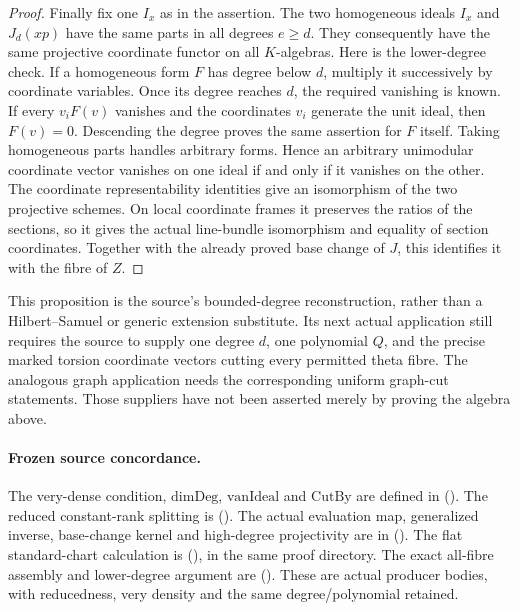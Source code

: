 \begin{proof}
Finally fix one \(I_x\) as in the assertion.
The two homogeneous ideals \(I_x\) and \(J_d(xp)\)
have the same parts in all degrees \(e\ge d\).
They consequently have the same projective coordinate
functor on all \(K\)-algebras.
Here is the lower-degree check.
If a homogeneous form \(F\) has degree below \(d\),
multiply it successively by coordinate variables.
Once its degree reaches \(d\), the required vanishing
is known.
If every \(v_iF(v)\) vanishes and the coordinates
\(v_i\) generate the unit ideal, then \(F(v)=0\).
Descending the degree proves the same assertion for
\(F\) itself.
Taking homogeneous parts handles arbitrary forms.
Hence an arbitrary unimodular coordinate vector
vanishes on one ideal if and only if it vanishes on
the other.
The coordinate representability identities give an
isomorphism of the two projective schemes.
On local coordinate frames it preserves the ratios of
the sections, so it gives the actual line-bundle
isomorphism and equality of section coordinates.
Together with the already proved base change of \(J\),
this identifies it with the fibre of \(Z\).
\end{proof}

This proposition is the source's bounded-degree reconstruction,
rather than a Hilbert--Samuel or generic extension substitute.
Its next actual application still requires the source to supply
one degree \(d\), one polynomial \(Q\), and the precise marked
torsion coordinate vectors cutting every permitted theta
fibre.  The analogous graph application needs the corresponding
uniform graph-cut statements.  Those suppliers have not been
asserted merely by proving the algebra above.

\paragraph{Frozen source concordance.}
The very-dense condition, \(\mathrm{dimDeg}\),
\(\mathrm{vanIdeal}\) and \(\mathrm{CutBy}\) are defined in
().
The reduced constant-rank splitting is
().
The actual evaluation map, generalized inverse, base-change
kernel and high-degree projectivity are in
().
The flat standard-chart calculation is
(),
in the same proof directory.
The exact all-fibre assembly and lower-degree argument are
().
These are actual producer bodies, with reducedness,
very density and the same degree/polynomial retained.
